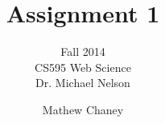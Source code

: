 \documentclass[10pt,letterpaper]{scrartcl}
\begin{document}
\author{Mathew Chaney}
\title{Assignment 1}
\subtitle{Fall 2014\\ CS595 Web Science\\ Dr. Michael Nelson}
\maketitle
\newpage

\tableofcontents




\end{document}
